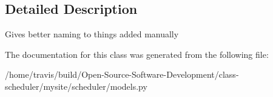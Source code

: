 \subsection{Detailed Description}
\begin{DoxyVerb}    Gives better naming to things added manually
\end{DoxyVerb}
 

The documentation for this class was generated from the following file\-:\begin{DoxyCompactItemize}
\item 
/home/travis/build/\-Open-\/\-Source-\/\-Software-\/\-Development/class-\/scheduler/mysite/scheduler/models.\-py\end{DoxyCompactItemize}
